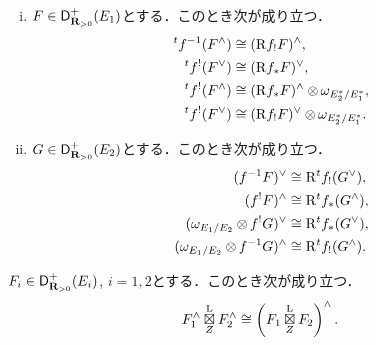 \begin{PRP}[{\cite[Proposition 3.7.14]{KS90}}]
    \begin{enumerate}[(i)]
        \item \(F\in\Dlcon(E_1)\)とする．このとき次が成り立つ．
        \begin{align*}
            {}^tf^{-1}(F^\wedge)&\cong (\Rder{f}_!F)^\wedge,\\
            {}^tf^{!}(F^\vee)&\cong (\Rder{f}_\ast F)^\vee,\\
            {}^tf^{!}(F^\wedge)&\cong (\Rder{f}_{\ast}F)^\wedge\tens\omega_{E_2^\ast/E_1^\ast},\\
            {}^tf^{!}(F^\vee)&\cong (\Rder{f}_{!}F)^\vee\tens\omega_{E_2^\ast/E_1^\ast}.
        \end{align*}
        \item \(G\in\Dlcon(E_2)\)とする．このとき次が成り立つ．
        \begin{align*}
            (f^{-1}F)^\vee&\cong \Rder^t{f}_!(G^\vee),\\
            (f^{!}F)^\wedge&\cong \Rder^t{f}_\ast(G^\wedge),\\
            (\omega_{E_1/E_2}\tens f^!G)^\vee&\cong \Rder^t{f}_\ast(G^\vee),\\
            (\omega_{E_1/E_2}\tens f^{-1}G)^\wedge&\cong \Rder^t{f}_!(G^\wedge).
        \end{align*}
    \end{enumerate}
\end{PRP}
\begin{PRP}[{\cite[Proposition 3.7.15]{KS90}}]
    \(F_i\in\Dlcon(E_i)\), \(i=1,2\)とする．このとき次が成り立つ．
    \[
        F_1^\wedge\letens[Z]F_2^\wedge
        \cong
        \left(F_1\letens[Z]F_2\right)^\wedge.
    \]
\end{PRP}

